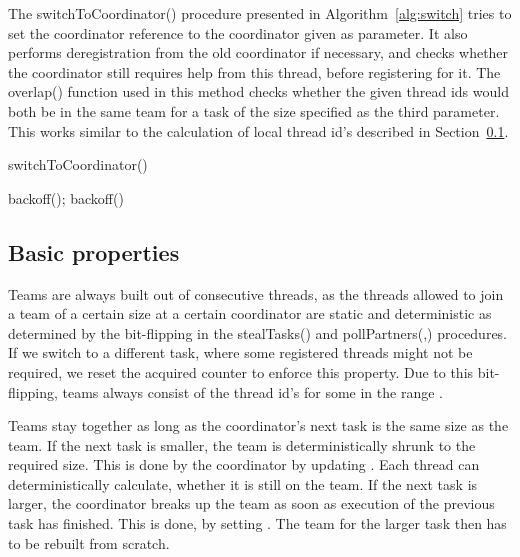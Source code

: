 \documentclass[preprint]{sigplanconf}
\begin{document}
The switchToCoordinator() procedure presented in
Algorithm~\ref{alg:switch} tries to set the coordinator reference 
to the coordinator given as parameter. It also performs deregistration
from the old coordinator if necessary, and checks whether the
coordinator still requires help from this thread, before registering
for it. The overlap() function used in this method checks whether the
given thread ids would both be in the same team for a task of the size
specified as the third parameter. This works similar to the
calculation of local thread id's described in Section~\ref{sec:prop}.

\begin{algorithm}
\caption{switchToCoordinator()}\label{alg:switch}
\begin{algorithmic}[1]
\LOOP
	\STATE 
		\IF {}
			\STATE {}
			\STATE 
				\STATE {}
				\RETURN
			\ENDIF
			\STATE 
			\STATE 
				\STATE backoff();
			\ELSE
				\RETURN
			\ENDIF
		\ELSE
			\STATE 
			\STATE 
				\STATE {}
				\IF{}
					\STATE {}
					\STATE 
					\STATE 
					\STATE 
					\STATE 
					\STATE 
					\STATE 
				\ENDIF
				\STATE 
				\STATE 
			\ELSE
				\STATE backoff()
			\ENDIF
		\ENDIF
	\ELSE
		\RETURN
	\ENDIF
\ENDLOOP

\end{algorithmic}
\end{algorithm}

\subsection{Basic properties}
\label{sec:prop}

Teams are always built out of consecutive threads, as the threads
allowed to join a team of a certain size at a certain coordinator are
static and deterministic as determined by the bit-flipping in the
stealTasks() and pollPartners(,) procedures.  If we switch to a
different task, where some registered threads might not be required,
we reset the acquired counter  to enforce this property. Due to
this bit-flipping, teams always consist of the thread id's
 for some  in the range .

Teams stay together as long as the coordinator's next task is
the same size as the team. If the next task is smaller, the team is
deterministically shrunk to the required size. This is done by the
coordinator by updating . Each thread can deterministically
calculate, whether it is still on the team. If the next task is
larger, the coordinator breaks up the team as soon as execution of the
previous task has finished. This is done, by setting . The team
for the larger task then has to be rebuilt from scratch.
\end{document}
